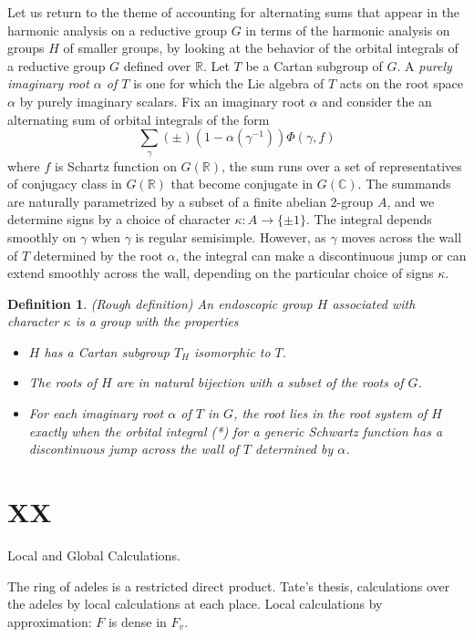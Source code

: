 \documentclass[brochure,english,12pt]{bourbaki}
\newtheorem{definition}[equation]{Definition}
\newcommand{\ring}[1]{\mathbb{#1}}
\begin{document}
Let us return to the theme of accounting for alternating sums that
appear in the harmonic analysis on a reductive group $G$ in terms of
the harmonic analysis on groups $H$ of smaller groups, by looking at
the behavior of the orbital integrals of a reductive group $G$ defined
over $\ring{R}$.  Let $T$ be a Cartan subgroup of $G$.  A {\it purely
  imaginary root $\alpha$ of $T$} is one for which the Lie algebra of $T$
acts on the root space $\alpha$ by purely imaginary scalars.
Fix an imaginary root $\alpha$ and
consider the an alternating sum of orbital integrals of the form
\[
\sum_\gamma (\pm) (1-\alpha(\gamma^{-1})) \Phi(\gamma,f)
\]
where $f$ is Schartz function on $G(\ring{R})$, the sum runs over a
set of representatives of conjugacy class in $G(\ring{R})$ that become
conjugate in $G(\ring{C})$.  The summands are naturally parametrized
by a subset of a finite abelian $2$-group $A$, and we determine signs
by a choice of character $\kappa:A\to \{ \pm1 \}$.  The integral
depends smoothly on $\gamma$ when $\gamma$ is regular semisimple.
However, as $\gamma$ moves across the wall of $T$ determined by the
root $\alpha$, the integral can make a discontinuous jump or can extend
smoothly across the wall, depending on the particular choice of signs
$\kappa$.  

\begin{definition}
(Rough definition)
An endoscopic group $H$ associated with character $\kappa$ is a group
with the properties
\begin{itemize}
\item $H$ has a Cartan subgroup $T_H$ isomorphic to $T$.
\item The roots of $H$ are in natural bijection with a subset of the roots of $G$.
\item For each imaginary root $\alpha$ of $T$ in $G$, the root
lies in the root system of $H$ exactly when the orbital integral (*)
for a generic Schwartz function has a discontinuous jump across 
the wall of $T$ determined by $\alpha$.
\end{itemize}
\end{definition}


\section{XX}
Local and Global Calculations.

The ring of adeles is a restricted direct product.  Tate's thesis,
calculations over the adeles by local calculations at each place.
Local calculations by approximation: $F$ is dense in $F_v$.
\end{document}
